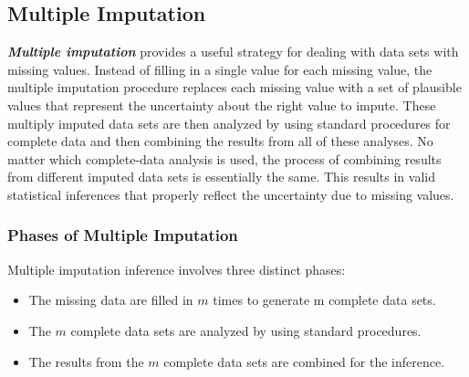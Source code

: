 \documentclass[a4paper,12pt]{article}
\begin{document}
\subsection{Multiple Imputation}
\textbf{\textit{Multiple imputation}} provides a useful strategy for dealing
with data sets with missing values. Instead of filling in a
single value for each missing value, the multiple
imputation procedure replaces each missing value with a
set of plausible values that represent the uncertainty about
the right value to impute. These multiply imputed data sets
are then analyzed by using standard procedures for complete
data and then combining the results from all of these analyses.
No matter which complete-data analysis is used, the process
of combining results from different imputed data sets
is essentially the same. This results in valid statistical inferences
that properly reflect the uncertainty due to missing
values.

\subsubsection{Phases of Multiple Imputation}
Multiple imputation inference involves three distinct phases:
\begin{itemize}
	\item The missing data are filled in $m$ times to generate m
	complete data sets.
	\item The $m$ complete data sets are analyzed by using
	standard procedures.
	\item The results from the $m$ complete data sets are combined
	for the inference.
\end{itemize}
\end{document}
